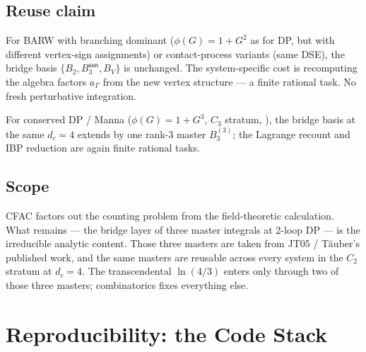 \documentclass[11pt,a4paper]{article}
\newcommand{\Llog}{\ln(4/3)}
\theoremstyle{definition}
\theoremstyle{plain}
\begin{document}
\subsection{Reuse claim}

\begin{cfacbox}
For BARW with branching dominant ($\phi(G) = 1 + G^2$ as for DP, but
with different vertex-sign assignments) or contact-process variants
(same DSE), the bridge basis $\{B_2, B_3^{\textsf{sun}}, B_V\}$ is
unchanged.  The system-specific cost is recomputing the algebra
factors $a_\Gamma$ from the new vertex structure --- a finite
rational task.  No fresh perturbative integration.

For conserved DP / Manna ($\phi(G) = 1 + G^3$, $C_3$ stratum,
\cite{AmarteifioCFAC2026}), the bridge basis at the same $d_c = 4$
extends by one rank-3 master $B_3^{(3)}$; the Lagrange recount and
IBP reduction are again finite rational tasks.
\end{cfacbox}

\subsection{Scope}

\begin{stdbox}
CFAC factors out the counting problem from the field-theoretic
calculation.  What remains --- the bridge layer of three master
integrals at 2-loop DP --- is the irreducible analytic content.  Those
three masters are taken from JT05 / T\"auber's published work, and
the same masters are reusable across every system in the $C_2$
stratum at $d_c = 4$.  The transcendental $\Llog$ enters only through
two of those three masters; combinatorics fixes everything else.
\end{stdbox}

\section{Reproducibility: the Code Stack}\label{sec:codestack}
\end{document}
